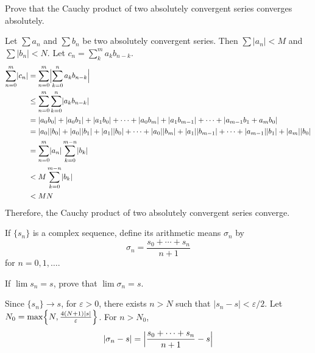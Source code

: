 \begin{exercise}
\begin{exercise}[label = (\alph*)]
  \end{exercise}
\item
  Prove that the Cauchy product of two absolutely convergent series converges
  absolutely.
  \par\smallskip
  Let \(\sum a_n\) and \(\sum b_n\) be two absolutely convergent series.
  Then \(\sum\lvert a_n\rvert < M\) and \(\sum\lvert b_n\rvert < N\).
  Let \(c_n = \sum_k^ma_kb_{n - k}\).
  \begin{align*}
    \sum_{n = 0}^m\lvert c_n\rvert
    & = \sum_{n = 0}^m\Bigl\lvert\sum_{k = 0}^n a_kb_{n - k}\Bigr\rvert\\
    & \leq \sum_{n = 0}^m\sum_{k = 0}^n\lvert a_kb_{n - k}\rvert\\
    & = \lvert a_0b_0\rvert + \lvert a_0b_1\rvert + \lvert a_1b_0\rvert +
      \cdots + \lvert a_0b_m\rvert + \lvert a_1b_{m - 1}\rvert + \cdots +
      \lvert a_{m - 1}b_1 + a_mb_0\rvert\\
    & = \lvert a_0\rvert\lvert b_0\rvert + \lvert a_0\rvert\lvert b_1\rvert +
      \lvert a_1\rvert\lvert b_0\rvert + \cdots + \lvert a_0\rvert
      \lvert b_m\rvert + \lvert a_1\rvert\lvert b_{m - 1}\rvert + \cdots +
      \lvert a_{m - 1}\rvert\lvert b_1\rvert + \lvert a_m\rvert
      \lvert b_0\rvert\\
    & = \sum_{n = 0}^m\lvert a_n\rvert\sum_{k = 0}^{m - n}\lvert b_k\rvert\\
    & < M\sum_{k = 0}^{m - n}\lvert b_k\rvert\\
    & < MN
  \end{align*}
  Therefore, the Cauchy product of two absolutely convergent series converge.
\item
  If \(\{s_n\}\) is a complex sequence, define its arithmetic means
  \(\sigma_n\) by
  \[
  \sigma_n = \frac{s_0 + \cdots + s_n}{n + 1}
  \]
  for \(n = 0,1,\ldots\).
  \begin{exercise}[label = (\alph*), ref = \arabic{exercisei} (\alph*)]
  \item
    \label{3.12.a}
    If \(\lim s_n = s\), prove that \(\lim\sigma_n = s\).
    \par\smallskip
    Since \(\{s_n\}\to s\), for \(\varepsilon > 0\), there exists \(n > N\) such
    that \(\lvert s_n - s\rvert < \varepsilon/2\).
    Let \(N_0 = \max\Bigl\{N,\frac{4(N + 1)\lvert s\rvert}{\varepsilon}\Bigr\}\).
    For \(n > N_0\),
    \begin{align*}
      \lvert\sigma_n - s\rvert
      & = \Bigl\lvert\frac{s_0 + \cdots + s_n}{n + 1} - s\Bigr\rvert\\

\end{align*}
\end{exercise}
\end{exercise}
